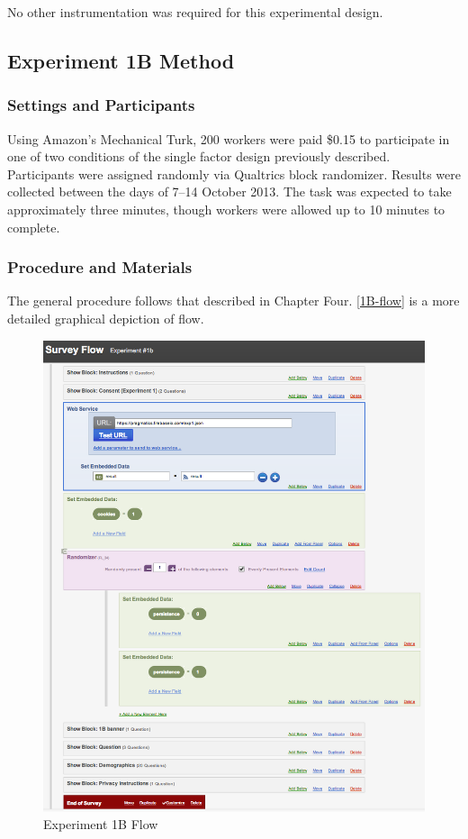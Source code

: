 No other instrumentation was required for this experimental design.

\subsection{Experiment 1B Method}
\label{experiment1bmethod}

\subsubsection{Settings and Participants}
\label{settingsandparticipants}

Using Amazon's Mechanical Turk, 200 workers were paid \$0.15 to participate in one of two conditions of the single factor design previously described. Participants were assigned randomly via Qualtrics block randomizer. Results were collected between the days of 7--14 October 2013. The task was expected to take approximately three minutes, though workers were allowed up to 10 minutes to complete.

\subsubsection{Procedure and Materials}
\label{procedureandmaterials}

The general procedure follows that described in Chapter Four.  \autoref{1B-flow}  is a more detailed graphical depiction of flow.

\begin{figure}
\centerline{
  \includegraphics[scale=.4]{chapter5.tex/1b-flow}
  }
\caption{Experiment 1B Flow}
\label{1B-flow}
\end{figure}

